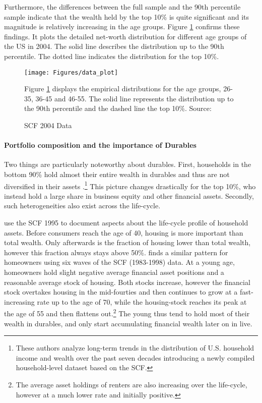 \documentclass[a4paper,12pt,legno]{article}
\begin{document}
Furthermore, the differences between the full sample and the 90th percentile sample indicate that the wealth held by the top 10\% is quite significant and its magnitude is relatively increasing in the age groups. Figure \ref{scf_data} confirms these findings. It plots the detailed net-worth distribution for different age groups of the US in 2004. The solid line describes the distribution up to the 90th percentile. The dotted line indicates the distribution for the top 10\%. 
\begin{figure}[!htbp]
\caption{SCF 2004 Data} 
\label{scf_data}	%
\centering
\texttt{[image: Figures/data\_plot]}  %

\begin{minipage}{0.8\linewidth}
\footnotesize{Figure \ref{scf_data} displays the empirical distributions for the age groups, 26-35, 36-45 and 46-55. The solid line represents the distribution up to the 90th percentile and the dashed line the top 10\%. Source: \cite{hintermaier2011}}
\end{minipage}

\end{figure}

\paragraph{Portfolio composition and the importance of Durables}
Two things are particularly noteworthy about durables. First, households in the bottom 90\% hold almost their entire wealth in durables and thus are not diversified in their assets \citep{kuhn2017income}.\footnote{These authors analyze long-term trends in the distribution of U.S. household income and wealth over the past seven decades introducing a newly compiled household-level dataset based on the SCF.} This picture changes drastically for the top 10\%, who instead hold a large share in business equity and other financial assets. Secondly, such heterogeneities also exist across the life-cycle. 

\cite{FV&K2011} use the SCF 1995 to document aspects about the life-cycle profile of household assets. Before consumers reach the age of 40, housing is more important than total wealth. Only afterwards is the fraction of housing lower than total wealth, however this fraction always stays above 50\%. \citep{yang2009} finds a similar pattern for  homeowners using six waves of the SCF (1983-1998) data. At a young age,  homeowners hold slight negative average financial asset positions and a reasonable average stock of housing. Both stocks increase, however the financial stock overtakes housing in the mid-fourties and then continues to grow at a fast-increasing rate up to the age of 70, while the housing-stock reaches its peak at the age of 55 and then flattens out.\footnote{The average asset holdings of renters are also increasing over the life-cycle, however at a much lower rate and initially positive.} The young thus tend to hold most of their wealth in durables, and only start accumulating financial wealth later on in live. \\
\end{document}
